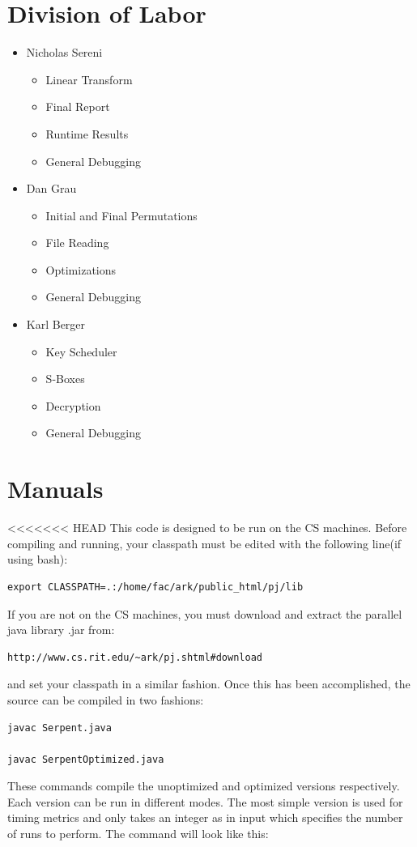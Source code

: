 \documentclass[12pt]{article} %
\begin{document}
\section{Division of Labor}
\begin{itemize}
 \item Nicholas Sereni
 \begin{itemize}
  \item{Linear Transform}
  \item{Final Report}
  \item{Runtime Results}
  \item{General Debugging}
 \end{itemize}
 \item{Dan Grau}
 \begin{itemize}
  \item{Initial and Final Permutations}
  \item{File Reading}
  \item{Optimizations}
  \item{General Debugging}
 \end{itemize}
 \item{Karl Berger}
 \begin{itemize}
  \item{Key Scheduler}
  \item{S-Boxes}
  \item{Decryption}
  \item{General Debugging}
 \end{itemize}
\end{itemize}

\section{Manuals}
<<<<<<< HEAD
This code is designed to be run on the CS machines. Before compiling and running, your classpath must be edited with the following line(if using bash):
\begin{lstlisting}
export CLASSPATH=.:/home/fac/ark/public_html/pj/lib
\end{lstlisting}
If you are not on the CS machines, you must download and extract the parallel java library .jar from:
\begin{lstlisting}
http://www.cs.rit.edu/~ark/pj.shtml#download
\end{lstlisting}
and set your classpath in a similar fashion.  Once this has been accomplished, the source can be compiled in two fashions:
\begin{lstlisting}
javac Serpent.java

javac SerpentOptimized.java
\end{lstlisting}
These commands compile the unoptimized and optimized versions respectively. Each version can be run in different modes.  The most simple version is used for timing metrics and only takes an integer as in input which specifies the number of runs to perform.  The command will look like this:
\end{document}
